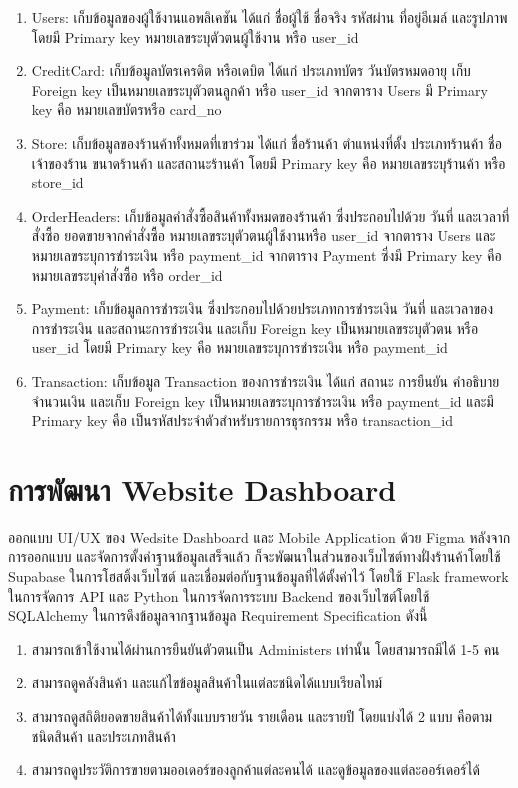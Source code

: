 \begin{enumerate}
  \item  Users: เก็บข้อมูลของผู้ใช้งานแอพลิเคชัน ได้แก่ ชื่อผู้ใช้ ชื่อจริง รหัสผ่าน ที่อยู่อีเมล์ และรูปภาพ โดยมี Primary key หมายเลขระบุตัวตนผู้ใช้งาน หรือ user\_id
  \item CreditCard: เก็บข้อมูลบัตรเครดิต หรือเดบิต ได้แก่ ประเภทบัตร วันบัตรหมดอายุ เก็บ Foreign key เป็นหมายเลขระบุตัวตนลูกค้า หรือ user\_id จากตาราง Users มี Primary key คือ หมายเลขบัตรหรือ card\_no
  \item Store: เก็บข้อมูลของร้านค้าทั้งหมดที่เขาร่วม ได้แก่ ชื่อร้านค้า ตำแหน่งที่ตั้ง ประเภทร้านค้า ชื่อเจ้าของร้าน ขนาดร้านค้า และสถานะร้านค้า โดยมี Primary key คือ หมายเลขระบุร้านค้า หรือ store\_id 
  \item OrderHeaders: เก็บข้อมูลคำสั่งซื้อสินค้าทั้งหมดของร้านค้า ซึ่งประกอบไปด้วย วันที่ และเวลาที่สั่งซื้อ ยอดขายจากคำสั่งซื้อ หมายเลขระบุตัวตนผู้ใช้งานหรือ user\_id จากตาราง Users และหมายเลขระบุการชำระเงิน หรือ payment\_id จากตาราง Payment ซึ่งมี Primary key คือ หมายเลขระบุคำสั่งซื้อ หรือ order\_id
  \item Payment: เก็บข้อมูลการชำระเงิน ซึ่งประกอบไปด้วยประเภทการชำระเงิน วันที่ และเวลาของการชำระเงิน และสถานะการชำระเงิน และเก็บ Foreign key เป็นหมายเลขระบุตัวตน หรือ user\_id โดยมี Primary key คือ หมายเลขระบุการชำระเงิน หรือ payment\_id
  \item Transaction: เก็บข้อมูล Transaction ของการชำระเงิน ได้แก่ สถานะ การยืนยัน คำอธิบาย จำนวนเงิน และเก็บ Foreign key เป็นหมายเลขระบุการชำระเงิน หรือ payment\_id และมี Primary key คือ เป็นรหัสประจำตัวสำหรับรายการธุรกรรม หรือ transaction\_id
 
\end{enumerate}

\section{การพัฒนา Website Dashboard }


ออกแบบ UI/UX ของ Wedsite Dashboard และ Mobile Application ด้วย Figma
หลังจากการออกแบบ และจัดการตั้งค่าฐานข้อมูลเสร็จแล้ว
ก็จะพัฒนาในส่วนของเว็บไซต์ทางฝั่งร้านค้าโดยใช้ Supabase ในการโฮสติ้งเว็บไซต์
และเชื่อมต่อกับฐานข้อมูลที่ได้ตั้งค่าไว้ โดยใช้ Flask framework
ในการจัดการ API และ Python ในการจัดการระบบ Backend ของเว็บไซต์โดยใช้ SQLAlchemy
ในการดึงข้อมูลจากฐานข้อมูล Requirement Specification ดังนี้

\begin{enumerate}
  \item สามารถเข้าใช้งานได้ผ่านการยืนยันตัวตนเป็น Administers เท่านั้น โดยสามารถมีได้ 1-5 คน
  \item สามารถดูคลังสินค้า และแก้ไขข้อมูลสินค้าในแต่ละชนิดได้แบบเรียลไทม์
  \item สามารถดูสถิติยอดขายสินค้าได้ทั้งแบบรายวัน รายเดือน และรายปี โดยแบ่งได้ 2 แบบ คือตามชนิดสินค้า และประเภทสินค้า
  \item สามารถดูประวัติการขายตามออเดอร์ของลูกค้าแต่ละคนได้ และดูข้อมูลของแต่ละออร์เดอร์ได้
\end{enumerate}





